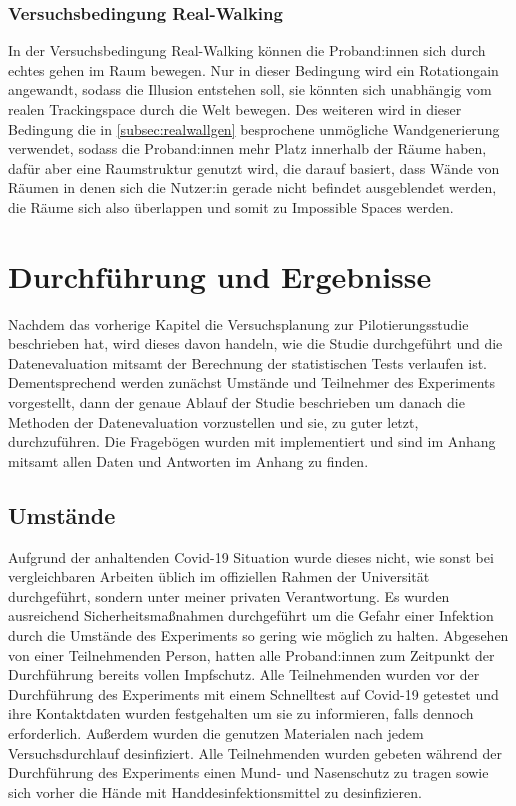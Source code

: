         \subsection{Versuchsbedingung Real-Walking}\label{subsec:realwalk}
            In der Versuchsbedingung Real-Walking können die Proband:innen sich durch echtes gehen im Raum bewegen. Nur in dieser Bedingung wird ein Rotationgain angewandt, sodass die Illusion entstehen soll, sie könnten sich unabhängig vom realen Trackingspace durch die Welt bewegen.
            Des weiteren wird in dieser Bedingung die in \autoref{subsec:realwallgen} besprochene unmögliche Wandgenerierung verwendet, sodass die Proband:innen mehr Platz innerhalb der Räume haben, dafür aber eine Raumstruktur genutzt wird, die darauf basiert, dass Wände von Räumen in denen sich die Nutzer:in gerade nicht befindet ausgeblendet werden, die Räume sich also überlappen und somit zu Impossible Spaces werden.




\chapter{Durchführung und Ergebnisse}\label{}
    Nachdem das vorherige Kapitel die Versuchsplanung zur Pilotierungsstudie beschrieben hat, wird dieses davon handeln, wie die Studie durchgeführt und die Datenevaluation mitsamt der Berechnung der statistischen Tests verlaufen ist. Dementsprechend werden zunächst Umstände und Teilnehmer des Experiments vorgestellt, dann der genaue Ablauf der Studie beschrieben um danach die Methoden der Datenevaluation vorzustellen und sie, zu guter letzt, durchzuführen. Die Fragebögen wurden mit  implementiert und sind im Anhang mitsamt allen Daten und Antworten im Anhang zu finden.

    \section{Umstände}\label{sec:circumstances}
        Aufgrund der anhaltenden Covid-19 Situation wurde dieses nicht, wie sonst bei vergleichbaren Arbeiten üblich im offiziellen Rahmen der Universität durchgeführt, sondern unter meiner privaten Verantwortung. Es wurden ausreichend Sicherheitsmaßnahmen durchgeführt um die Gefahr einer Infektion durch die Umstände des Experiments so gering wie möglich zu halten. Abgesehen von einer Teilnehmenden Person, hatten alle Proband:innen zum Zeitpunkt der Durchführung bereits vollen Impfschutz.
        Alle Teilnehmenden wurden vor der Durchführung des Experiments mit einem Schnelltest auf Covid-19 getestet und ihre Kontaktdaten wurden festgehalten um sie zu informieren, falls dennoch erforderlich. Außerdem wurden die genutzen Materialen nach jedem Versuchsdurchlauf desinfiziert.
        Alle Teilnehmenden wurden gebeten während der Durchführung des Experiments einen Mund- und Nasenschutz zu tragen sowie sich vorher die Hände mit Handdesinfektionsmittel zu desinfizieren.


